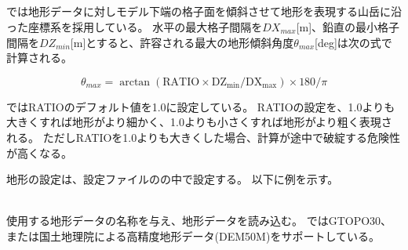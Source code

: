 


\subsection{\SecBasicTopoSetting} \label{subsec:basic_usel_topo}

\scalerm では地形データに対しモデル下端の格子面を傾斜させて地形を表現する山岳に沿った座標系を採用している。
水平の最大格子間隔を$DX_{max}$[m]、鉛直の最小格子間隔を$DZ_{min}$[m]とすると、許容される最大の地形傾斜角度$\theta_{max}$[deg]は次の式で計算される。

\[ \theta_{max} = \arctan( \mathrm{RATIO} \times \mathrm{DZ_{min}}/\mathrm{DX_{max}} ) \times 180/\pi \]

\scalerm ではRATIOのデフォルト値を1.0に設定している。
RATIOの設定を、1.0よりも大きくすれば地形がより細かく、1.0よりも小さくすれば地形がより粗く表現される。
ただしRATIOを1.0よりも大きくした場合、計算が途中で破綻する危険性が高くなる。

地形の設定は、設定ファイルのの中で設定する。
以下に例を示す。\\

\\


使用する地形データの名称を与え、地形データを読み込む。
\scalerm ではGTOPO30、または国土地理院による高精度地形データ(DEM50M)をサポートしている。

